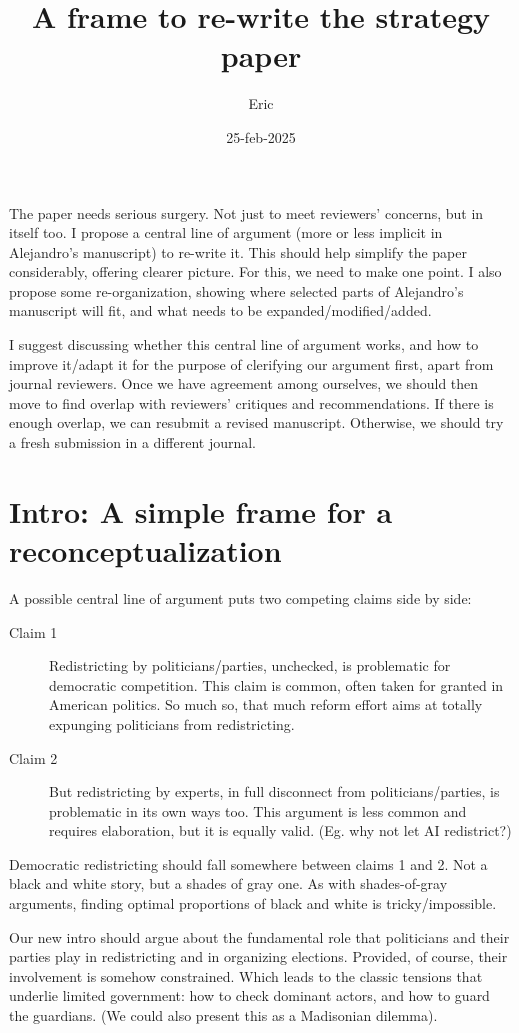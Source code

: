 \documentclass[12pt]{article}
\author{Eric}
\date{25-feb-2025}
\title{A frame to re-write the strategy paper}
\begin{document}
\maketitle
\noindent The paper needs serious surgery. Not just to meet reviewers' concerns, but in itself too. I propose a central line of argument (more or less implicit in Alejandro's manuscript) to re-write it. This should help simplify the paper considerably, offering clearer picture. For this, we need to make one point. I also propose some re-organization, showing where selected parts of Alejandro's manuscript will fit, and what needs to be expanded/modified/added. 

I suggest discussing whether this central line of argument works, and how to improve it/adapt it for the purpose of clerifying our argument first, apart from journal reviewers. Once we have agreement among ourselves, we should then move to find overlap with reviewers' critiques and recommendations. If there is enough overlap, we can resubmit a revised manuscript. Otherwise, we should try a fresh submission in a different journal. 
\section{Intro: A simple frame for a reconceptualization}
\label{sec:org060bea7}
A possible central line of argument puts two competing claims side by side:
\begin{description}
\item[{Claim 1}] Redistricting by politicians/parties, unchecked, is problematic for democratic competition. This claim is common, often taken for granted in American politics. So much so, that much reform effort aims at totally expunging politicians from redistricting.
\item[{Claim 2}] But redistricting by experts, in full disconnect from politicians/parties, is problematic in its own ways too. This argument is less common and requires elaboration, but it is equally valid. (Eg. why not let AI redistrict?)
\end{description}

\noindent Democratic redistricting should fall somewhere between claims 1 and 2. Not a black and white story, but a shades of gray one. As with shades-of-gray arguments, finding optimal proportions of black and white is tricky/impossible.

Our new intro should argue about the fundamental role that politicians and their parties play in redistricting and in organizing elections. Provided, of course, their involvement is somehow constrained. Which leads to the classic tensions that underlie limited government: how to check dominant actors, and how to guard the guardians. (We could also present this as a Madisonian dilemma).
\end{document}
